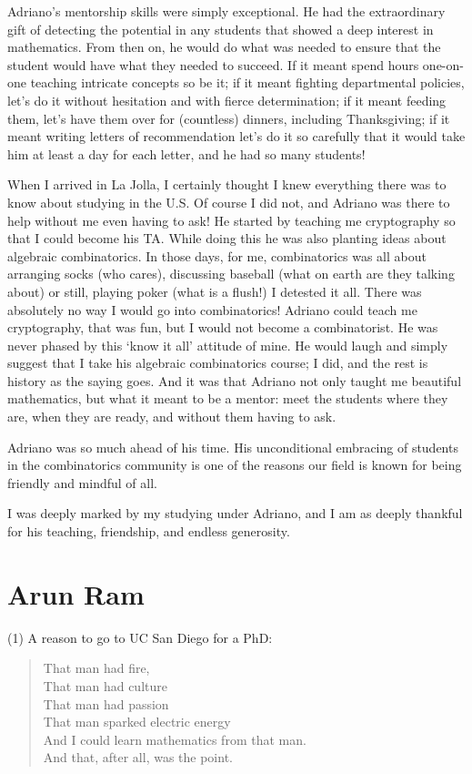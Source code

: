 \documentclass{notices}
\begin{document}
Adriano's mentorship skills were simply exceptional.  He had the extraordinary gift of detecting the potential in any students that showed a deep interest in mathematics. From then on, he would do what was needed to ensure that the student would have what they needed to succeed. If it meant spend hours one-on-one teaching intricate concepts so be it; if it meant fighting  departmental policies, let's do it without hesitation and with fierce determination; if it meant feeding them, let's have them over for (countless) dinners, including Thanksgiving; if it meant writing letters of recommendation let's do it so carefully that it would take him at least a day for each letter, and he had so many students!

When I arrived in La Jolla, I certainly thought I knew everything there was to know about studying in the U.S. Of course I did not, and Adriano was there to help without me even having to ask!   He started by teaching me cryptography so that I could become his TA. While doing this he was also planting ideas about algebraic combinatorics. In those days, for me, combinatorics was all about arranging socks (who cares), discussing baseball (what on earth are they talking about) or still, playing poker (what is a flush!) I detested it all. There was absolutely no way I would go into combinatorics! Adriano could teach me cryptography, that was fun, but I would not become a combinatorist. He was never phased by this `know it all' attitude of mine. He would laugh and simply suggest that I take his algebraic combinatorics course; I did, and the rest is history as the saying goes. And it was that Adriano not only taught me beautiful mathematics, but what it meant to be a mentor: meet the students where they are, when they are ready, and without them having to ask.

Adriano was so much ahead of his time. His unconditional embracing of students in the combinatorics community is one of the reasons our field is known for being friendly and mindful of all.

I was deeply marked by my studying under Adriano, and I am as deeply thankful for his teaching, friendship, and endless generosity. 



\section*{Arun Ram}
(1)  A reason to go to UC San Diego for a PhD:
\begin{quote}
That man had fire,\\
That man had culture\\
That man had passion\\
That man sparked electric energy\\
And I could learn mathematics from that man.\\
And that, after all, was the point.
\end{quote}
\end{document}
